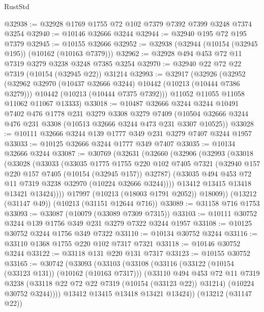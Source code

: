 \begin{lexlean}{RustStd}
\begin{coremodule}
@32938 := @32928 @1769 @1755 @72 @102 @7379 @7392 @7399 @3248 @7374 @3254
@32940 := @10146 @32666 @3244
@32944 := @32940 @195 @72 @195 @7379
@32945 := @10155 @32666
@32952 := @32938 (@32944 (@10154 (@32945 @195)) (@10162 (@10163 @7379)))
@32962 := @32928 @494 @453 @72 @11 @7319 @3279 @3238 @3248 @7385 @3254
@32970 := @32940 @22 @72 @22 @7319 (@10154 (@32945 @22)) @31214
@32993 := @32917
    (@32926
      (@32952
        (@32962 @32970 (@10437 @32666 @3244) @10442 (@10213 (@10444 @7386 @3279)))
        @10442
        (@10213 (@10444 @7375 @7392)))
      @11052
      @11055
      @11058
      @11062
      @11067
      @13333)
@33018 := @10487
    @32666
    @3244
    @3244
    @10491
    @7402
    @476
    @1778
    @231
    @3279
    @3308
    @3279
    @7409
    (@10504 @32666 @3244 @476 @231 @3308 (@10513 @32666 @3244 @473 @231 @3307 @10525))
@33028 := @10111 @32666 @3244 @139 @1777 @349 @231 @3279 @7407 @3244 @1957
@33033 := @10125 @32666 @3244 @1777 @349 @7407
@33035 := @10134 @32666 @3244
@33087 := @30769
    (@32631
      (@32660
        (@32906
          (@32993
            (@33018
              (@33028
                (@33033
                  (@33035
                    @1775
                    @1755
                    @220
                    @102
                    @7405
                    @7321
                    (@32940 @157 @220 @157 @7405 (@10154 (@32945 @157)) @32787)
                    (@33035 @494 @453 @72 @11 @7319 @3238 @32970 (@10224 @32666 @3244))))
                @13412
                @13415
                @13418
                @13421
                @13424))))
        @17997
        (@10213 (@18003 @1791 @2052))
        @18009))
    (@13212 (@31147 @49))
    (@10213 (@31151 @12644 @716))
@33089 := @31158 @716 @1753
@33093 := @33087 (@10079 (@33089 @7309 @7315))
@33103 := @10111 @30752 @3244 @139 @1756 @349 @231 @3279 @7322 @3244 @1957
@33108 := @10125 @30752 @3244 @1756 @349 @7322
@33110 := @10134 @30752 @3244
@33116 := @33110 @1368 @1755 @220 @102 @7317 @7321
@33118 := @10146 @30752 @3244
@33122 := @33118 @131 @220 @131 @7317
@33123 := @10155 @30752
@33165 := @30742
    (@33093
      (@33103
        (@33108
          (@33116
            (@33122 (@10154 (@33123 @131)) (@10162 (@10163 @7317)))
            (@33110
              @494
              @453
              @72
              @11
              @7319
              @3238
              (@33118 @22 @72 @22 @7319 (@10154 (@33123 @22)) @31214)
              (@10224 @30752 @3244))))
        @13412
        @13415
        @13418
        @13421
        @13424))
    (@13212 (@31147 @22))

\end{coremodule}
\end{lexlean}
